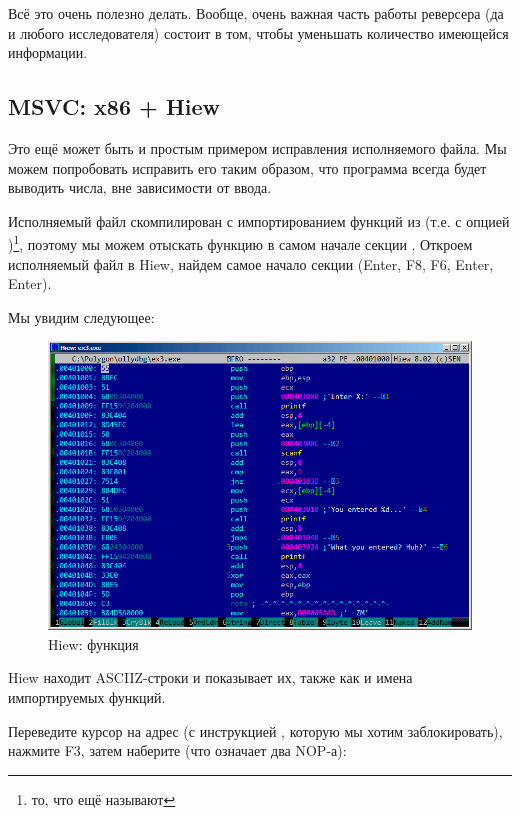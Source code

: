 Всё это очень полезно делать.
Вообще, очень важная часть работы реверсера (да и любого исследователя) состоит в том, чтобы уменьшать количество имеющейся информации.

\ifdefined\IncludeOlly

\fi

\clearpage
\subsection{MSVC: x86 + Hiew}

Это ещё может быть и простым примером исправления исполняемого файла.
Мы можем попробовать исправить его таким образом, что программа всегда будет выводить числа, вне зависимости от ввода.

Исполняемый файл скомпилирован с импортированием функций из
 (т.е. с опцией )\footnote{то, что ещё называют }, 
поэтому мы можем отыскать функцию \main в самом начале секции .
Откроем исполняемый файл в Hiew, найдем самое начало секции  (Enter, F8, F6, Enter, Enter).

Мы увидим следующее:

\begin{figure}[H]
\centering
\includegraphics[scale=\FigScale]{patterns/04_scanf/3_checking_retval/hiew_1.png}
\caption{Hiew: функция \main}
\label{fig:scanf_ex3_hiew_1}
\end{figure}

Hiew находит \ac{ASCIIZ}-строки и показывает их, также как и имена импортируемых функций.

\clearpage
Переведите курсор на адрес  (с инструкцией , которую мы хотим заблокировать), нажмите F3, затем наберите  (что означает два \ac{NOP}-а):

